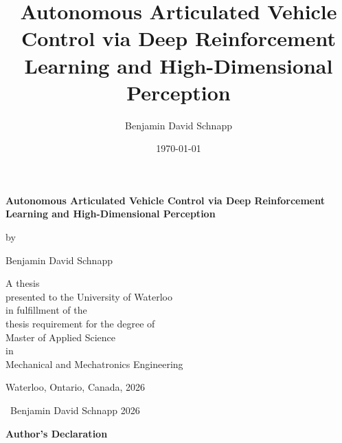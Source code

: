 \documentclass[12pt]{report}
\title{Autonomous Articulated Vehicle Control via Deep Reinforcement Learning and High-Dimensional Perception}
\author{Benjamin David Schnapp}
\date{\today}
\begin{document}
\pagestyle{plain}

\thispagestyle{empty}
\begin{center}
\vspace*{\fill}
{\LARGE\bfseries Autonomous Articulated Vehicle Control via Deep Reinforcement Learning and High-Dimensional Perception\par}
\vspace{2.5cm}

by\par
\vspace{1cm}

Benjamin David Schnapp\par
\vspace{2.5cm}

A thesis\\
presented to the University of Waterloo\\
in fulfillment of the\\
thesis requirement for the degree of\\
Master of Applied Science\\
in\\
Mechanical and Mechatronics Engineering\par
\vspace{2.5cm}

Waterloo, Ontario, Canada, 2026\par
\vspace{1cm}

\textcopyright\ Benjamin David Schnapp 2026\par
\vspace*{\fill}
\end{center}
\clearpage


\begin{center}\textbf{Author's Declaration}\end{center}
\vspace{1em}
\end{document}
